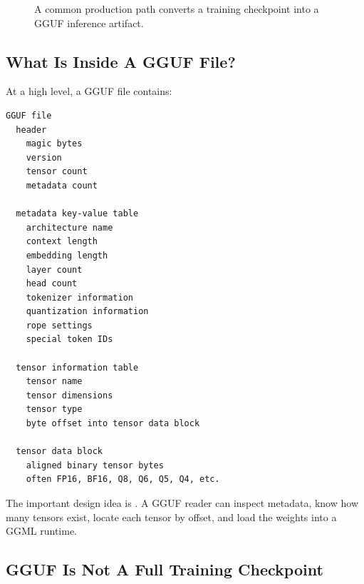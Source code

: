 \begin{figure}[htbp]
\centering
{}
\caption{A common production path converts a training checkpoint into a GGUF inference artifact.}
\end{figure}

\subsection{What Is Inside A GGUF File?}

At a high level, a GGUF file contains:

\begin{lstlisting}
GGUF file
  header
    magic bytes
    version
    tensor count
    metadata count

  metadata key-value table
    architecture name
    context length
    embedding length
    layer count
    head count
    tokenizer information
    quantization information
    rope settings
    special token IDs

  tensor information table
    tensor name
    tensor dimensions
    tensor type
    byte offset into tensor data block

  tensor data block
    aligned binary tensor bytes
    often FP16, BF16, Q8, Q6, Q5, Q4, etc.
\end{lstlisting}

The important design idea is . A GGUF reader can inspect metadata,
know how many tensors exist, locate each tensor by offset, and load the weights into a
GGML runtime.

\subsection{GGUF Is Not A Full Training Checkpoint}

